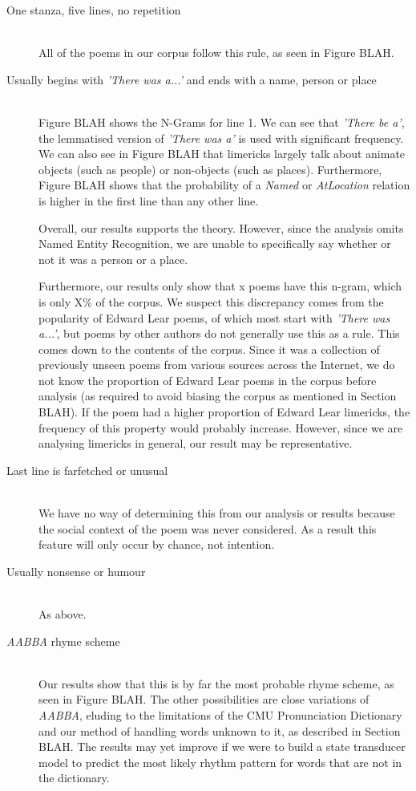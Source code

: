 \begin{description}
\item[One stanza, five lines, no repetition]  \hfill \\
All of the poems in our corpus follow this rule, as seen in Figure BLAH.


\item[Usually begins with \textit{'There was a...'} and ends with a name, person or place]  \hfill \\
Figure BLAH shows the N-Grams for line 1. We can see that \textit{'There be a'}, the lemmatised version of \textit{'There was a'} is used with significant frequency. We can also see in Figure BLAH that limericks largely talk about animate objects (such as people) or non-objects (such as places). Furthermore, Figure BLAH shows that the probability of a \textit{Named} or \textit{AtLocation} relation is higher in the first line than any other line.

Overall, our results supports the theory. However, since the analysis omits Named Entity Recognition, we are unable to specifically say whether or not it was a person or a place.

Furthermore, our results only show that x poems have this n-gram, which is only X\% of the corpus. We suspect this discrepancy comes from the popularity of Edward Lear poems, of which most start with \textit{'There was a...'}, but poems by other authors do not generally use this as a rule. This comes down to the contents of the corpus. Since it was a collection of previously unseen poems from various sources across the Internet, we do not know the proportion of Edward Lear poems in the corpus before analysis (as required to avoid biasing the corpus as mentioned in Section BLAH). If the poem had a higher proportion of Edward Lear limericks, the frequency of this property would probably increase. However, since we are analysing limericks in general, our result may be representative.

\item[Last line is farfetched or unusual]  \hfill \\
We have no way of determining this from our analysis or results because the social context of the poem was never considered. As a result this feature will only occur by chance, not intention.

\item[Usually nonsense or humour]  \hfill \\
As above.

\item[\textit{AABBA} rhyme scheme]  \hfill \\
Our results show that this is by far the most probable rhyme scheme, as seen in Figure BLAH. The other possibilities are close variations of \textit{AABBA}, eluding to the limitations of the CMU Pronunciation Dictionary and our method of handling words unknown to it, as described in Section BLAH. The results may yet improve if we were to build a state transducer model to predict the most likely rhythm pattern for words that are not in the dictionary.


\end{description}
